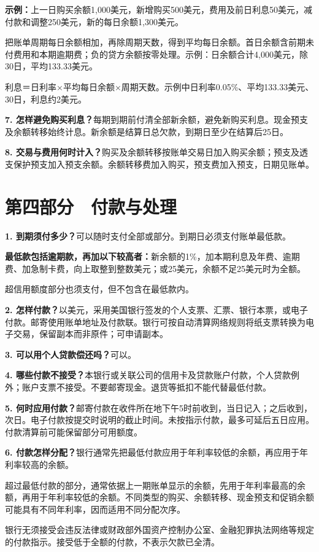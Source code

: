 \documentclass[UTF8,fontset=none,11pt,a4paper]{ctexart}
\begin{document}
\textbf{示例：}上一日购买余额1,000美元，新增购买500美元，费用及前日利息50美元，减付款和调整250美元，新的每日余额1,300美元。


把账单周期每日余额相加，再除周期天数，得到平均每日余额。首日余额含前期未付费用和本期逾期费；负的贷方余额按零处理。示例：日余额合计4,000美元，除30日，平均133.33美元。


利息＝日利率×平均每日余额×周期天数。示例中日利率0.05\%、平均133.33美元、30日，利息约2美元。


\textbf{7. 怎样避免购买利息？}每期到期前付清全部新余额，避免新购买利息。现金预支及余额转移始终计息。新余额是结算日总欠款，到期日至少在结算后25日。


\textbf{8. 交易与费用何时计入？}购买及余额转移按账单交易日加入购买余额；预支及透支保护预支加入预支余额。余额转移费加入购买，预支费加入预支，日期见账单。


\section*{第四部分　付款与处理}
\textbf{1. 到期须付多少？}可以随时支付全部或部分。到期日必须支付账单最低款。


\textbf{最低款包括逾期款，再加以下较高者：}新余额的1\%，加本期利息及年费、逾期费、加急制卡费，向上取整到整数美元；或25美元，余额不足25美元时为全额。


超信用额度部分也须支付，但不包含在最低款内。


\textbf{2. 怎样付款？}以美元，采用美国银行签发的个人支票、汇票、银行本票，或电子付款。邮寄使用账单地址及付款联。银行可按自动清算网络规则将纸支票转换为电子交易，保留副本而非原件；可申请副本。


\textbf{3. 可以用个人贷款偿还吗？}可以。


\textbf{4. 哪些付款不接受？}本银行或关联公司的信用卡及贷款账户付款，个人贷款例外；账户支票不接受。不要邮寄现金。退货等抵扣不能代替最低付款。


\textbf{5. 何时应用付款？}邮寄付款在收件所在地下午5时前收到，当日记入；之后收到，次日。电子付款按提交时说明的截止时间。未按指示付款，最多可延后五日应用。付款清算前可能保留部分可用额度。


\textbf{6. 付款怎样分配？}银行通常先把最低付款应用于年利率较低的余额，再应用于年利率较高的余额。


超过最低付款的部分，通常依据上一期账单显示的余额，先用于年利率最高的余额，再用于年利率较低的余额。不同类型的购买、余额转移、现金预支和促销余额可能具有不同年利率，因而适用不同分配次序。


银行无须接受会违反法律或财政部外国资产控制办公室、金融犯罪执法网络等规定的付款指示。接受低于全额的付款，不表示欠款已全清。
\end{document}
